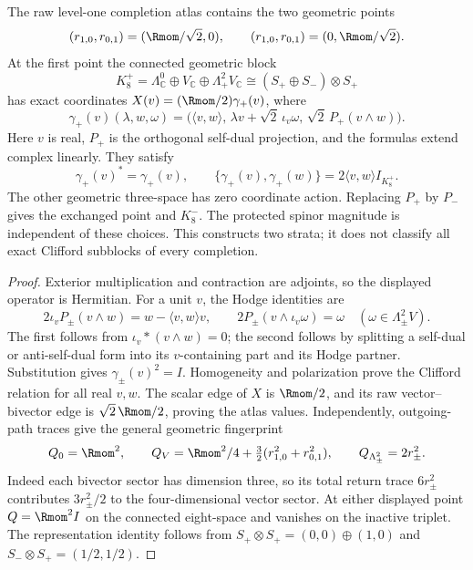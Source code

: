 \documentclass[11pt]{article}
\begin{document}
\begin{theorem}
\label{p1:thm:v214-exact-eight-clifford-strata}
The raw level-one completion atlas contains the two geometric points
\[
 (r_{1,0},r_{0,1})=(\Rmom/\sqrt2,0),
 \qquad (r_{1,0},r_{0,1})=(0,\Rmom/\sqrt2).
\]
At the first point the connected geometric block
\[
 K_8^+=\Lambda^0_{\mathbb C}\oplus V_{\mathbb C}
                         \oplus\Lambda^2_+V_{\mathbb C}
 \cong(S_+\oplus S_-)\otimes S_+
\]
has exact coordinates \(X(v)=(\Rmom/2)\gamma_+(v)\), where
\[
 \gamma_+(v)(\lambda,w,\omega)=
 \bigl(\langle v,w\rangle,\,
       \lambda v+\sqrt2\,\iota_v\omega,\,
       \sqrt2\,P_+(v\wedge w)\bigr).
\]
Here \(v\) is real, \(P_+\) is the orthogonal self-dual projection, and
the formulas extend complex linearly. They satisfy
\[
 \gamma_+(v)^*=\gamma_+(v),\qquad
 \{\gamma_+(v),\gamma_+(w)\}=2\langle v,w\rangle I_{K_8^+}.
\]
The other geometric three-space has zero coordinate action. Replacing
\(P_+\) by \(P_-\) gives the exchanged point and \(K_8^-\).
The protected spinor magnitude is independent of these choices.
This constructs two strata; it does not classify all exact Clifford
subblocks of every completion.
\end{theorem}
\begin{proof}
Exterior multiplication and contraction are adjoints, so the displayed
operator is Hermitian. For a unit \(v\), the Hodge identities are
\[
 2\iota_vP_\pm(v\wedge w)=w-\langle v,w\rangle v,\qquad
 2P_\pm(v\wedge\iota_v\omega)=\omega
 \quad(\omega\in\Lambda^2_\pm V).
\]
The first follows from
\(\iota_v*(v\wedge w)=0\); the second follows by splitting a
self-dual or anti-self-dual form into its \(v\)-containing part and
its Hodge partner. Substitution gives \(\gamma_\pm(v)^2=I\).
Homogeneity and polarization prove the Clifford relation for all real
\(v,w\). The scalar edge of \(X\) is \(\Rmom/2\), and its raw
vector--bivector edge is \(\sqrt2\,\Rmom/2\), proving the atlas values.
Independently, outgoing-path traces give the general geometric fingerprint
\[
 Q_0=\Rmom^2,\qquad
 Q_V=\Rmom^2/4+\tfrac32(r_{1,0}^2+r_{0,1}^2),\qquad
 Q_{\Lambda^2_\pm}=2r_\pm^2.
\]
Indeed each bivector sector has dimension three, so its total return
trace \(6r_\pm^2\) contributes \(3r_\pm^2/2\) to the
four-dimensional vector sector. At either displayed point \(Q=\Rmom^2I\)
on the connected eight-space and vanishes on the inactive triplet.
The representation identity follows from
\(S_+\otimes S_+=(0,0)\oplus(1,0)\) and
\(S_-\otimes S_+=(1/2,1/2)\).
\end{proof}
\end{document}
